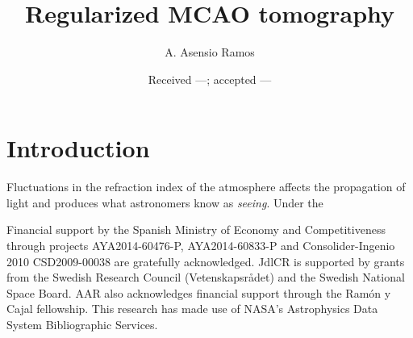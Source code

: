 \documentclass[]{aa} %
\begin{document}
\title{Regularized MCAO tomography}

\author{A. Asensio Ramos}

             
  \date{Received ---; accepted ---} 


   \titlerunning{}
   \maketitle
%

\section{Introduction}
Fluctuations in the refraction index of the atmosphere affects the propagation of 
light and produces what astronomers know as \emph{seeing}. Under the

\begin{acknowledgements}
Financial support by the Spanish Ministry of Economy and Competitiveness 
through projects AYA2014-60476-P, AYA2014-60833-P and Consolider-Ingenio 2010 CSD2009-00038 
are gratefully acknowledged. 
JdlCR is supported by grants from the
Swedish Research Council (Vetenskapsr\aa det) and the Swedish National Space Board.
AAR also acknowledges financial support through the Ram\'on y Cajal fellowship. 
This research has made use of NASA's Astrophysics Data System Bibliographic Services.
\end{acknowledgements}

% 
% 
\end{document}
